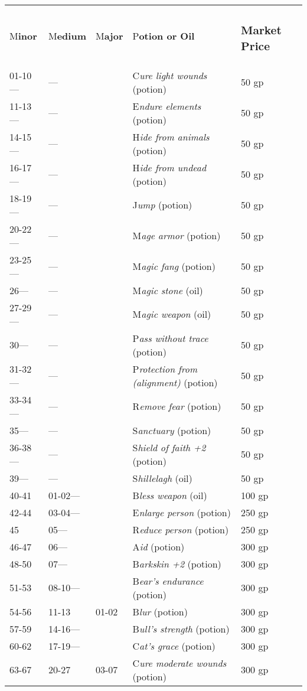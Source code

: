 \documentclass{article}
\begin{document}
\begin{tabular}{|>{\raggedright}p{27pt}|>{\raggedright}p{34pt}|>{\raggedright}p{26pt}|>{\raggedright}p{149pt}|>{\raggedright}p{52pt}|}
\hline
\multicolumn{5}{|p{290pt}|}{T\textbf{able: Potions and Oils}}\tabularnewline
\hline
M\textbf{inor} & M\textbf{edium} & M\textbf{ajor} & P\textbf{otion or Oil} & \subsubsection*{M\textbf{arket 
Price}}\tabularnewline
\hline
01-10--- & --- &  & C\textit{ure light wounds }(potion) & 50 gp\tabularnewline
\hline
11-13--- & --- &  & E\textit{ndure elements }(potion) & 50 gp\tabularnewline
\hline
14-15--- & --- &  & H\textit{ide from animals }(potion) & 50 gp\tabularnewline
\hline
16-17--- & --- &  & H\textit{ide from undead }(potion) & 50 gp\tabularnewline
\hline
18-19--- & --- &  & J\textit{ump }(potion) & 50 gp\tabularnewline
\hline
20-22--- & --- &  & M\textit{age armor }(potion) & 50 gp\tabularnewline
\hline
23-25--- & --- &  & M\textit{agic fang }(potion) & 50 gp\tabularnewline
\hline
26--- & --- &  & M\textit{agic stone }(oil) & 50 gp\tabularnewline
\hline
27-29--- & --- &  & M\textit{agic weapon }(oil) & 50 gp\tabularnewline
\hline
30--- & --- &  & P\textit{ass without trace }(potion) & 50 gp\tabularnewline
\hline
31-32--- & --- &  & P\textit{rotection from (alignment) }(potion) & 50 gp\tabularnewline
\hline
33-34--- & --- &  & R\textit{emove fear }(potion) & 50 gp\tabularnewline
\hline
35--- & --- &  & S\textit{anctuary }(potion) & 50 gp\tabularnewline
\hline
36-38--- & --- &  & S\textit{hield of faith +2 }(potion) & 50 gp\tabularnewline
\hline
39--- & --- &  & S\textit{hillelagh }(oil) & 50 gp\tabularnewline
\hline
40-41 & 01-02--- &  & B\textit{less weapon }(oil) & 100 gp\tabularnewline
\hline
42-44 & 03-04--- &  & E\textit{nlarge person }(potion) & 250 gp\tabularnewline
\hline
45 & 05--- &  & R\textit{educe person }(potion) & 250 gp\tabularnewline
\hline
46-47 & 06--- &  & A\textit{id }(potion) & 300 gp\tabularnewline
\hline
48-50 & 07--- &  & B\textit{arkskin +2 }(potion) & 300 gp\tabularnewline
\hline
51-53 & 08-10--- &  & B\textit{ear's endurance }(potion) & 300 gp\tabularnewline
\hline
54-56 & 11-13 & 01-02 & B\textit{lur }(potion) & 300 gp\tabularnewline
\hline
57-59 & 14-16--- &  & B\textit{ull's strength }(potion) & 300 gp\tabularnewline
\hline
60-62 & 17-19--- &  & C\textit{at's grace }(potion) & 300 gp\tabularnewline
\hline
63-67 & 20-27 & 03-07 & C\textit{ure moderate wounds }(potion) & 300 gp\tabularnewline

\end{tabular}
\end{document}
